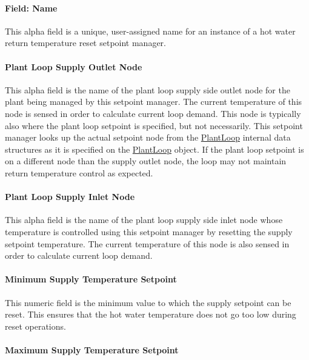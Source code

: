 \paragraph{Field: Name}\label{field-name-28-000}

This alpha field is a unique, user-assigned name for an instance of a hot water return temperature reset setpoint manager.

\paragraph{Plant Loop Supply Outlet Node}\label{plant-loop-supply-outlet-node-1}

This alpha field is the name of the plant loop supply side outlet node for the plant being managed by this setpoint manager. The current temperature of this node is sensed in order to calculate current loop demand. This node is typically also where the plant loop setpoint is specified, but not necessarily. This setpoint manager looks up the actual setpoint node from the \hyperref[plantloop]{PlantLoop} internal data structures as it is specified on the \hyperref[plantloop]{PlantLoop} object. If the plant loop setpoint is on a different node than the supply outlet node, the loop may not maintain return temperature control as expected.

\paragraph{Plant Loop Supply Inlet Node}\label{plant-loop-supply-inlet-node-1}

This alpha field is the name of the plant loop supply side inlet node whose temperature is controlled using this setpoint manager by resetting the supply setpoint temperature. The current temperature of this node is also sensed in order to calculate current loop demand.

\paragraph{Minimum Supply Temperature Setpoint}\label{minimum-supply-temperature-setpoint-1}

This numeric field is the minimum value to which the supply setpoint can be reset. This ensures that the hot water temperature does not go too low during reset operations.

\paragraph{Maximum Supply Temperature Setpoint}\label{maximum-supply-temperature-setpoint-1}

